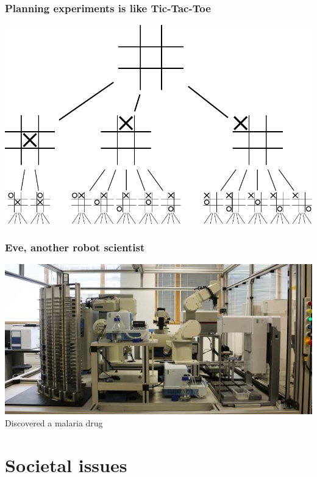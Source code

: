 \documentclass{beamer}
\begin{document}
\begin{frame}
  \frametitle{Planning experiments is like Tic-Tac-Toe}
  \begin{center}
    \includegraphics[width=\textwidth]{figures/Tic-tac-toe-game-tree}
  \end{center}
\end{frame}

\begin{frame}
  \frametitle{Eve, another robot scientist}
  \includegraphics[width=\textwidth]{figures/eve.jpg}
  Discovered a malaria drug
\end{frame}

\section{Societal issues}

\end{document}
